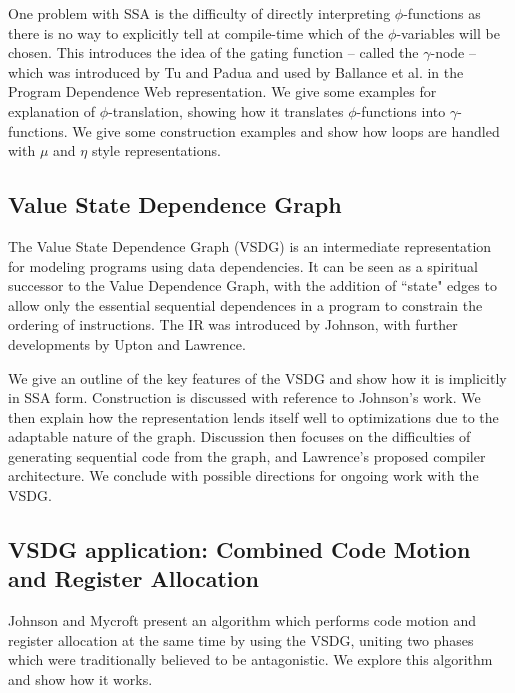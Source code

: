 One problem with SSA is the difficulty of directly interpreting $\phi$-functions as there is no way to explicitly tell at compile-time which of the $\phi$-variables will be chosen. This introduces the idea of the gating function -- called the $\gamma$-node -- which was introduced by Tu and Padua \cite{207115} and used by Ballance et al. in the Program Dependence Web\cite{93578} representation. We give some examples for explanation of $\phi$-translation, showing how it translates $\phi$-functions into $\gamma$-functions.
We give some construction examples and show how loops are handled with $\mu$ and $\eta$ style representations.

\subsection*{Value State Dependence Graph}

The Value State Dependence Graph (VSDG) is an intermediate representation for modeling programs using data dependencies. It can be seen as a spiritual successor to the Value Dependence Graph\cite{177907}, with the addition of ``state" edges to allow only the essential sequential dependences in a program to constrain the ordering of instructions. The IR was introduced by Johnson\cite{UCAM-CL-TR-607}, with further developments by Upton\cite{upton} and Lawrence\cite{UCAM-CL-TR-705}.

We give an outline of the key features of the VSDG and show how it is implicitly in SSA form. Construction is discussed with reference to Johnson's work. We then explain how the representation lends itself well to optimizations due to the adaptable nature of the graph. Discussion then focuses on the difficulties of generating sequential code from the graph\cite{DBLP:conf/pdpta/Upton03}, and Lawrence's proposed compiler architecture. We conclude with possible directions for ongoing work with the VSDG.

\subsection*{VSDG application: Combined Code Motion and Register Allocation}

Johnson and Mycroft \cite{johnson-combined} present an algorithm which performs code motion and register allocation at the same time by using the VSDG, uniting two phases which were traditionally believed to be antagonistic. We explore this algorithm and show how it works.


